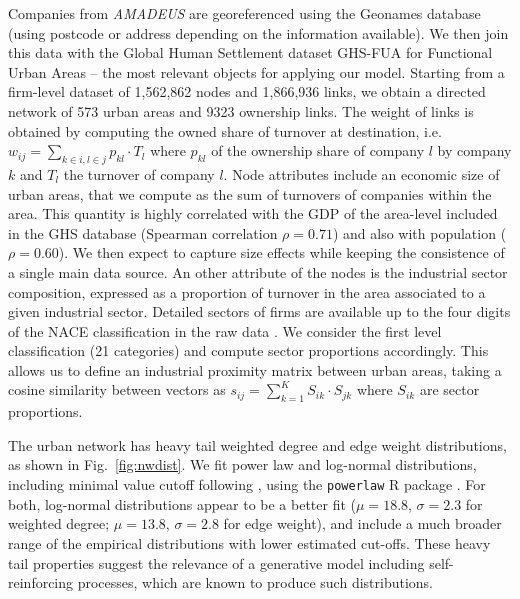 \documentclass[10pt,letterpaper]{article}
\begin{document}
Companies from \emph {AMADEUS} are georeferenced using the Geonames database (using postcode or address depending on the information available). We then join this data with the Global Human Settlement dataset GHS-FUA for Functional Urban Areas \cite{Florczyk2019ghs} -- the most relevant objects for applying our model. Starting from a firm-level dataset of 1,562,862 nodes and 1,866,936 links, we obtain a directed network of 573 urban areas and 9323 ownership links. The weight of links is obtained by computing the owned share of turnover at destination, i.e. $w_{ij} = \sum_{k \in i,l \in j} p_{kl} \cdot T_l$ where $p_{kl}$ of the ownership share of company $l$ by company $k$ and $T_l$ the turnover of company $l$. Node attributes include an economic size of urban areas, that we compute as the sum of turnovers of companies within the area. This quantity is highly correlated with the GDP of the area-level included in the GHS database (Spearman correlation $\rho = 0.71$) and also with population ($\rho = 0.60$). We then expect to capture size effects while keeping the consistence of a single main data source. An other attribute of the nodes is the industrial sector composition, expressed as a proportion of turnover in the area associated to a given industrial sector. Detailed sectors of firms are available up to the four digits of the NACE classification in the raw data \cite{EUROSTAT2008}. We consider the first level classification (21 categories) and compute sector proportions accordingly. This allows us to define an industrial proximity matrix between urban areas, taking a cosine similarity between vectors as $s_{ij} = \sum_{k=1}^{K} S_{ik}\cdot S_{jk}$ where $S_{ik}$ are sector proportions.


The urban network has heavy tail weighted degree and edge weight distributions, as shown in Fig.~\ref{fig:nwdist}. We fit power law and log-normal distributions, including minimal value cutoff following \cite{clauset2009power}, using the \texttt{powerlaw} R package \cite{powerlawpackage}. For both, log-normal distributions appear to be a better fit ($\mu=18.8$, $\sigma=2.3$ for weighted degree; $\mu=13.8$, $\sigma=2.8$ for edge weight), and include a much broader range of the empirical distributions with lower estimated cut-offs. These heavy tail properties suggest the relevance of a generative model including self-reinforcing processes, which are known to produce such distributions.
\end{document}
